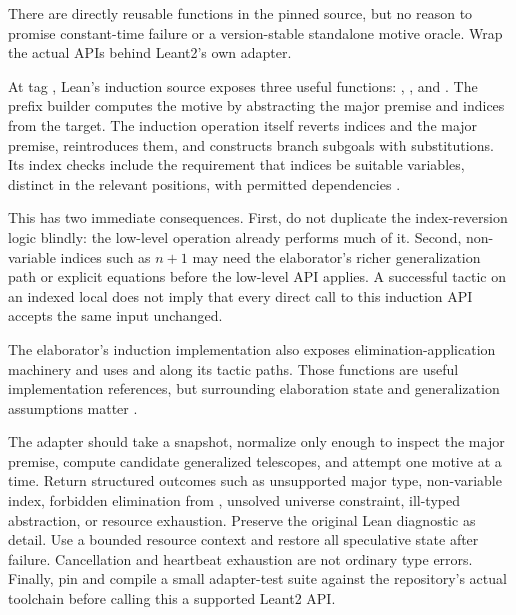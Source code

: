 \ans There are directly reusable functions in the pinned source, but no reason to promise constant-time failure or a version-stable standalone motive oracle. Wrap the actual APIs behind Leant2's own adapter.

At tag , Lean's induction source exposes three useful functions: , , and . The prefix builder computes the motive by abstracting the major premise and indices from the target. The induction operation itself reverts indices and the major premise, reintroduces them, and constructs branch subgoals with substitutions. Its index checks include the requirement that indices be suitable variables, distinct in the relevant positions, with permitted dependencies \cite{leaninduction}.

This has two immediate consequences. First, do not duplicate the index-reversion logic blindly: the low-level operation already performs much of it. Second, non-variable indices such as $n+1$ may need the elaborator's richer generalization path or explicit equations before the low-level API applies. A successful  tactic on an indexed local does not imply that every direct call to this induction API accepts the same input unchanged.

The elaborator's induction implementation also exposes elimination-application machinery and uses  and  along its tactic paths. Those functions are useful implementation references, but surrounding elaboration state and generalization assumptions matter \cite{leanfuninduction}.

The adapter should take a snapshot, normalize only enough to inspect the major premise, compute candidate generalized telescopes, and attempt one motive at a time. Return structured outcomes such as unsupported major type, non-variable index, forbidden elimination from , unsolved universe constraint, ill-typed abstraction, or resource exhaustion. Preserve the original Lean diagnostic as detail. Use a bounded resource context and restore all speculative state after failure. Cancellation and heartbeat exhaustion are not ordinary type errors. Finally, pin and compile a small adapter-test suite against the repository's actual toolchain before calling this a supported Leant2 API.
